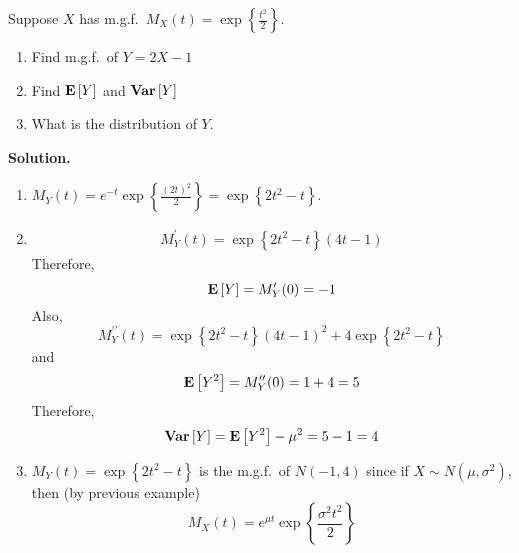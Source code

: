 \begin{Example}{}{}
    Suppose $ X $ has m.g.f.\ $ \displaystyle  M_X(t)=\exp\left\{ \frac{t^2}{2} \right\} $.
    \begin{enumerate}[label=(\roman*)]
        \item Find m.g.f.\ of $ Y=2X-1 $
        \item Find $ \bm{\mathrm{E}}\left[Y\right] $ and $ \bm{\mathrm{Var}}\left[Y\right] $
        \item What is the distribution of $ Y $.
    \end{enumerate}

    \textbf{Solution.}
    \begin{enumerate}[label=(\roman*)]
        \item $ \displaystyle  M_Y(t)=e^{-t}\exp\left\{ \frac{(2t)^2}{2}\right\}=
                  \exp\left\{ 2t^2-t\right\} $.

        \item \begin{align*}
                  M^\prime_Y(t)=\exp\left\{ 2t^2-t\right\}(4t-1)
              \end{align*}
              Therefore,
              \[ \bm{\mathrm{E}}\left[Y\right]=M^\prime_Y(0)=-1 \]
              Also,
              \[ M^{\prime\prime}_Y(t)=\exp\left\{ 2t^2-t\right\}(4t-1)^2+4
                  \exp\left\{ 2t^2-t\right\} \]
              and
              \[ \bm{\mathrm{E}}\left[Y^2\right]=M_Y^{\prime\prime}(0)=1+4=5 \]
              Therefore,
              \[ \bm{\mathrm{Var}}\left[Y\right]=\bm{\mathrm{E}}\left[Y^2\right]-\mu^2=5-1=4 \]
        \item $ M_Y(t)=\exp\left\{ 2t^2-t\right\} $ is the m.g.f.\
              of $ N(-1,4) $ since
              if $ X \sim N(\mu,\sigma^2) $, then (by previous example)
              \[ M_X(t)=e^{\mu t}\exp\left\{ \frac{\sigma^2 t^2}{2} \right\} \]
    \end{enumerate}
\end{Example}
